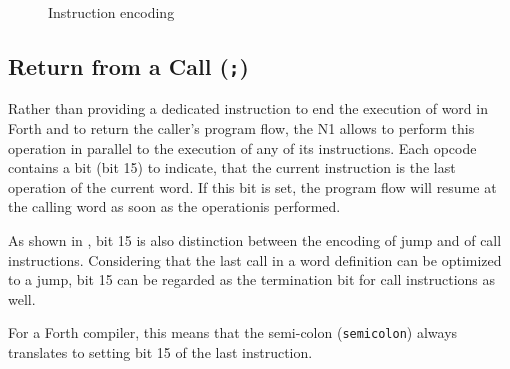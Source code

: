 \begin{figure}[!htb]
{{
    }
  }
  \caption{Instruction encoding}
  \label{opcodes:encoding}
\end{figure}

\subsection{Return from a Call (\texttt{;})}
\label{opcodes:rtc}

Rather than  providing a dedicated instruction to end the execution of 
word in Forth and to return the caller's program flow, the N1 allows
to perform this operation in parallel to the execution of any of its
instructions. Each \gls{opcode} contains a bit (bit 15) to indicate, that the
current instruction is the last operation of the current word. If this bit
is set, the program flow will resume at the calling word as soon as the
operationis performed.

As shown in , bit 15 is also distinction between the
encoding of \gls{jump} and of \gls{call} instructions.
Considering that the last \gls{call} in a word definition can be optimized
to a \gls{jump}, bit 15 can be regarded
as the termination bit for \gls{call} instructions as well.

For a Forth compiler, this means that the semi-colon (\texttt{\gls{semicolon}})
always translates to setting bit 15 of the last instruction.

